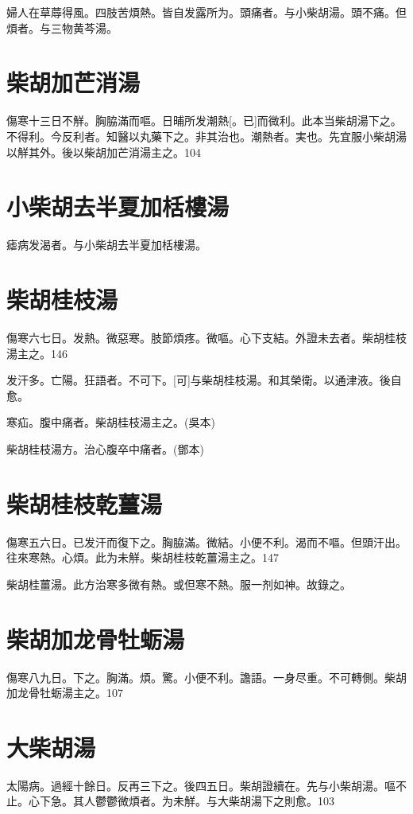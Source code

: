 \documentclass[12pt,oneside,UTF8,b5paper]{ctexbook}她她她她她她她
\begin{document}
婦人在草蓐得風。四肢苦煩熱。皆自发露所为。頭痛者。与小柴胡湯。頭不痛。但煩者。与三物黄芩湯。

\section{柴胡加芒消湯}

傷寒十三日不觧。胸脇滿而嘔。日晡所发潮熱[。已]而微利。此本当柴胡湯下之。不得利。今反利者。知醫以丸藥下之。非其治也。潮熱者。実也。先宜服小柴胡湯以觧其外。後以柴胡加芒消湯主之。104

\section{小柴胡去半夏加栝樓湯}

瘧病发渴者。与小柴胡去半夏加栝樓湯。

\section{柴胡桂枝湯}

傷寒六七日。发熱。微惡寒。肢節煩疼。微嘔。心下支結。外證未去者。柴胡桂枝湯主之。146

发汗多。亡陽。狂語者。不可下。[可]与柴胡桂枝湯。和其榮衛。以通津液。後自愈。

寒疝。腹中痛者。柴胡桂枝湯主之。(吳本)

柴胡桂枝湯方。治心腹卒中痛者。(鄧本)

\section{柴胡桂枝乾薑湯}

傷寒五六日。已发汗而復下之。胸脇滿。微結。小便不利。渴而不嘔。但頭汗出。往來寒熱。心煩。此为未觧。柴胡桂枝乾薑湯主之。147

柴胡桂薑湯。此方治寒多微有熱。或但寒不熱。服一剂如神。故錄之。

\section{柴胡加龙骨牡蛎湯}

傷寒八九日。下之。胸滿。煩。驚。小便不利。譫語。一身尽重。不可轉側。柴胡加龙骨牡蛎湯主之。107

\section{大柴胡湯}

太陽病。過經十餘日。反再三下之。後四五日。柴胡證續在。先与小柴胡湯。嘔不止。心下急。其人鬱鬱微煩者。为未觧。与大柴胡湯下之則愈。103
\end{document}
